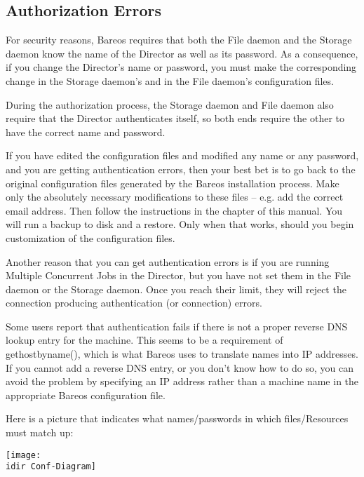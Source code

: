 \subsection{Authorization Errors}
\label{AuthorizationErrors}

   For security reasons, Bareos requires that both  the File daemon and the
   Storage daemon know the name  of the Director as well as its password. As a
   consequence,  if you change the Director's name or password, you must  make
   the corresponding change in the Storage daemon's and  in the File daemon's
   configuration files.  

   During the authorization process, the Storage daemon and File daemon
   also require that the Director authenticates itself, so both ends
   require the other to have the correct name and password.

   If you have edited the configuration files and modified any name or any password,
   and you are getting authentication errors, then your best bet is to go
   back to the original configuration files generated by the Bareos installation
   process.  Make only the absolutely necessary modifications to these
   files -- e.g.  add the correct email address.  Then follow the
   instructions in the  chapter of
   this manual.  You will run a backup to disk and a restore.  Only when
   that works, should you begin customization of the configuration files.

   Another reason that you can get authentication errors is if you are
   running Multiple Concurrent Jobs in the Director, but you have not set
   them in the File daemon or the Storage daemon.  Once you reach their
   limit, they will reject the connection producing authentication (or
   connection) errors.

   Some users report that authentication fails if there is not a proper
   reverse DNS lookup entry for the machine.  This seems to be a
   requirement of gethostbyname(), which is what Bareos uses to translate
   names into IP addresses.  If you cannot add a reverse DNS entry, or you
   don't know how to do so, you can avoid the problem by specifying an IP
   address rather than a machine name in the appropriate Bareos configuration file.

   Here is a picture that indicates what names/passwords in which
   files/Resources must match up:

   \begin{center}
   \texttt{[image: \\idir Conf-Diagram]}
   \end{center}

